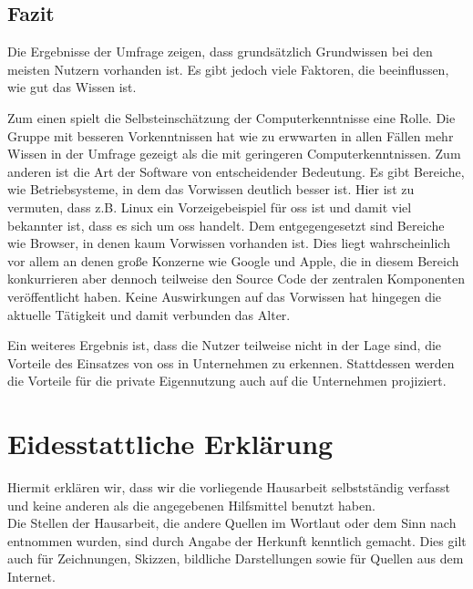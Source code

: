 \documentclass[a4paper]{article}
\begin{document}
        \subsection{Fazit}
            Die Ergebnisse der Umfrage zeigen, dass grundsätzlich Grundwissen bei den meisten Nutzern vorhanden ist. Es gibt jedoch viele Faktoren, die beeinflussen, wie gut das Wissen ist.
            
            Zum einen spielt die Selbsteinschätzung der Computerkenntnisse eine Rolle. Die Gruppe mit besseren Vorkenntnissen hat wie zu erwwarten in allen Fällen mehr Wissen in der Umfrage gezeigt als die mit geringeren Computerkenntnissen.
            Zum anderen ist die Art der Software von entscheidender Bedeutung. Es gibt Bereiche, wie Betriebsysteme, in dem das Vorwissen deutlich besser ist. Hier ist zu vermuten, dass z.B. Linux ein Vorzeigebeispiel für \gls{oss} ist und damit viel bekannter ist, dass es sich um \gls{oss} handelt. Dem entgegengesetzt sind Bereiche wie Browser, in denen kaum Vorwissen vorhanden ist. Dies liegt wahrscheinlich vor allem an denen große Konzerne wie Google und Apple, die in diesem Bereich konkurrieren aber dennoch teilweise den Source Code der zentralen Komponenten veröffentlicht haben.
            Keine Auswirkungen auf das Vorwissen hat hingegen die aktuelle Tätigkeit und damit verbunden das Alter.
            
            Ein weiteres Ergebnis ist, dass die Nutzer teilweise nicht in der Lage sind, die Vorteile des Einsatzes von \gls{oss} in Unternehmen zu erkennen. Stattdessen werden die Vorteile für die private Eigennutzung auch auf die Unternehmen projiziert.
                
    \clearpage
    \section{Eidesstattliche Erklärung}
        Hiermit erklären wir, dass wir die vorliegende Hausarbeit selbstständig verfasst und keine anderen als die angegebenen Hilfsmittel benutzt haben.\\
        Die Stellen der Hausarbeit, die andere Quellen im Wortlaut oder dem Sinn nach entnommen wurden, sind durch Angabe der Herkunft kenntlich gemacht. Dies gilt auch für Zeichnungen, Skizzen, bildliche Darstellungen sowie für Quellen aus dem Internet.
        
\end{document}
